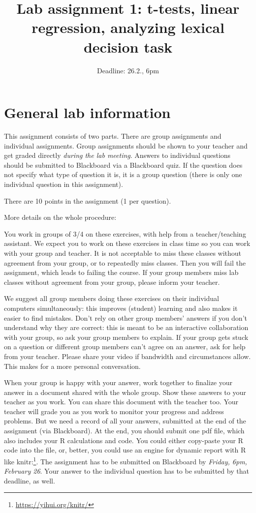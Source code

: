 \documentclass{article}\usepackage[]{graphicx}\usepackage[]{color}
\title{Lab assignment 1: t-tests, linear regression, analyzing lexical decision task}
\author{}
\date{Deadline: 26.2., 6pm}
\newcommand{\link}[1]{\footnote{\color{blue}\href{#1}{#1}}}
\begin{document}

\maketitle

\section{General lab information}

This assignment consists of two parts. There are group assignments and individual assignments. Group assignments should be shown to your teacher and get graded directly \emph{during the lab meeting}. Answers to individual questions should be submitted to Blackboard via a Blackboard quiz. If the question does not specify what type of question it is, it is a group question (there is only one individual question in this assignment).

There are 10 points in the assignment (1 per question).

More details on the whole procedure:

You work in groups of 3/4 on these exercises, with help from a teacher/teaching assistant. We expect you to work on these exercises in class time so you can work with your group and teacher. It is not acceptable to miss these classes without agreement from your group, or to repeatedly miss classes. Then you will fail the assignment, which leads to failing the course. If your group members miss lab classes without agreement from your group, please inform your teacher.

We suggest all group members doing these exercises on their individual computers simultaneously: this improves (student) learning and also makes it easier to find mistakes. Don't rely on other group members' answers if you don't understand why they are correct: this is meant to be an interactive collaboration with your group, so ask your group members to explain. If your group gets stuck on a question or different group members can't agree on an answer, ask for help from your teacher. Please share your video if bandwidth and circumstances allow. This makes for a more personal conversation.

When your group is happy with your answer, work together to finalize your answer in a document shared with the whole group. Show these answers to your teacher as you work. You can share this document with the teacher too. Your teacher will grade you as you work to monitor your progress and address problems. But we need a record of all your answers, submitted at the end of the assignment (via Blackboard). At the end, you should submit one pdf file, which also includes your R calculations and code. You could either copy-paste your R code into the file, or, better, you could use an engine for dynamic report with R like knitr:\link{https://yihui.org/knitr/}. The assignment has to be submitted on Blackboard by \emph{Friday, 6pm, February 26}. Your answer to the individual question has to be submitted by that deadline, as well.
\end{document}
